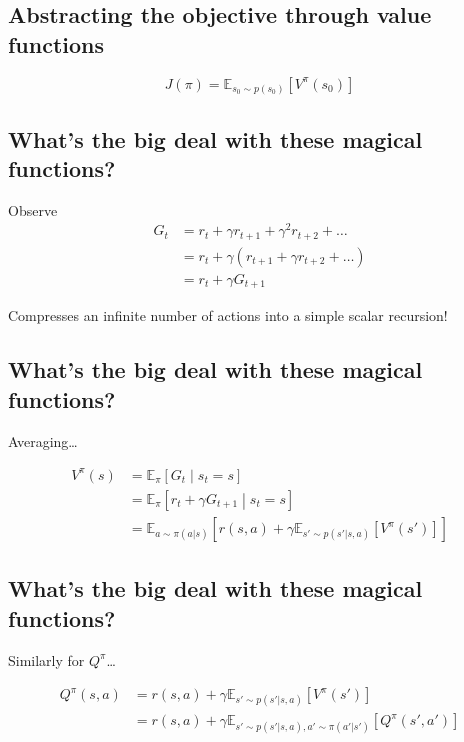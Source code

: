 \documentclass[
  letterpaper,
  DIV=11,
  numbers=noendperiod,
  oneside]{scrartcl}
\begin{document}
\subsection{Abstracting the objective through value
functions}\label{abstracting-the-objective-through-value-functions}

\[J(\pi) = \mathbb{E}_{s_0 \sim p(s_0)}\left[ V^\pi (s_0) \right]\]

\subsection{What's the big deal with these magical
functions?}\label{whats-the-big-deal-with-these-magical-functions}

Observe \begin{align}
G_t &= r_t + \gamma r_{t+1} + \gamma^2 r_{t+2} + \ldots \\
&= r_t + \gamma \left( r_{t+1} + \gamma r_{t+2} + \ldots \right) \\
&= r_t + \gamma G_{t+1}
\end{align}

Compresses an infinite number of actions into a simple scalar recursion!

\subsection{What's the big deal with these magical
functions?}\label{whats-the-big-deal-with-these-magical-functions-1}

Averaging\ldots{}

\begin{align}
V^\pi (s) &= \mathbb{E}_{\pi} \left[ G_t \middle| s_t = s \right] \\
&= \mathbb{E}_{\pi} \left[ r_t + \gamma G_{t+1} \middle| s_t = s \right] \\
&= \mathbb{E}_{a \sim \pi(a | s)} \left[ r(s,a) + \gamma \mathbb{E}_{s' \sim p(s' | s, a)} \left[ V^\pi (s') \right]\right]
\end{align}

\subsection{What's the big deal with these magical
functions?}\label{whats-the-big-deal-with-these-magical-functions-2}

Similarly for \(Q^\pi\)\ldots{}

\begin{align}
Q^\pi (s,a) &= r(s,a) + \gamma \mathbb{E}_{s' \sim p(s' | s, a)}\left[ V^\pi (s') \right]\\
&= r(s,a) + \gamma \mathbb{E}_{s' \sim p(s' | s, a), a' \sim \pi(a' | s')}\left[ Q^\pi (s',a') \right]
\end{align}
\end{document}

